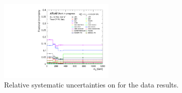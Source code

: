 \begin{figure}[t]
  \includegraphics[width=0.49\textwidth]{plots/diffx/final/data/3cr/Systematic_Uncertainties_data_ly_m_3cr_QCD_Sh2211_0p01sigma.pdf}
  \caption{Relative systematic uncertainties on \new for the data results.\label{fig:vbswy:data_relunc}}
\end{figure}
%
%
